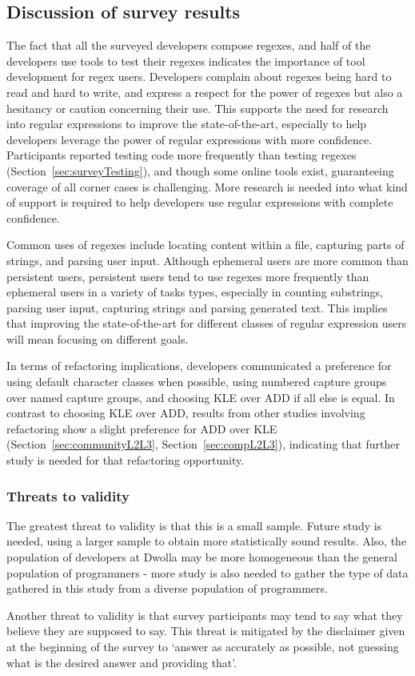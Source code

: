 \subsection{Discussion of survey results}

The fact that all the surveyed developers compose regexes, and half of the developers use tools to test their regexes indicates the importance of tool development for regex users.  Developers complain about regexes being hard to read and hard to write, and express a respect for the power of regexes but also a hesitancy or caution concerning their use.  This supports the need for research into regular expressions to improve the state-of-the-art, especially to help developers leverage the power of regular expressions with more confidence.  Participants reported testing code more frequently than testing regexes (Section~\ref{sec:surveyTesting}), and though some online tools exist, guaranteeing coverage of all corner cases is challenging.  More research is needed into what kind of support is required to help developers use regular expressions with complete confidence.

Common uses of regexes include locating content within a file, capturing parts of strings, and parsing user input.  Although ephemeral users are more common than persistent users, persistent users tend to use regexes more frequently than ephemeral users in a variety of tasks types, especially in counting substrings, parsing user input, capturing strings and parsing generated text.  This implies that improving the state-of-the-art for different classes of regular expression users will mean focusing on different goals.

In terms of refactoring implications, developers communicated a preference for using default character classes when possible, using numbered capture groups over named capture groups, and choosing KLE over ADD if all else is equal.  In contrast to choosing KLE over ADD, results from other studies involving refactoring show a slight preference for ADD over KLE (Section~\ref{sec:communityL2L3}, Section~\ref{sec:compL2L3}), indicating that further study is needed for that refactoring opportunity.

\subsubsection{Threats to validity}
The greatest threat to validity is that this is a small sample.  Future study is needed, using a larger sample to obtain more statistically sound results.  Also, the population of developers at Dwolla may be more homogeneous than the general population of programmers - more study is also needed to gather the type of data gathered in this study from a diverse population of programmers.

Another threat to validity is that survey participants may tend to say what they believe they are supposed to say.  This threat is mitigated by the disclaimer given at the beginning of the survey to `answer as accurately as possible, not guessing what is the desired answer and providing that'.


